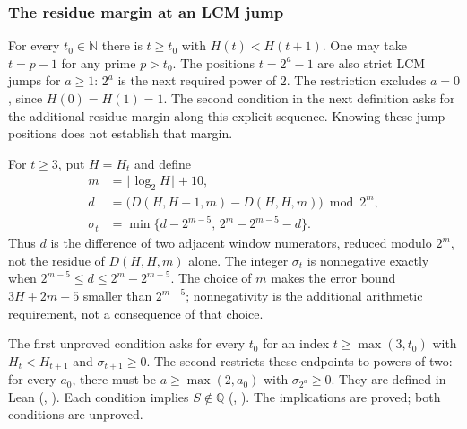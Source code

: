 \subsubsection{The residue margin at an LCM jump}

\begin{thm}\label{thm:arbitrarily-large-prime-power-lcm}
For every $t_0\in\mathbb N$ there is
$t\ge t_0$ with $H(t)<H(t+1)$. One may take $t=p-1$ for any
prime $p>t_0$. The positions $t=2^a-1$ are also strict LCM jumps for $a\ge1$:
$2^a$ is the next required power of $2$. The restriction excludes
$a=0$, since $H(0)=H(1)=1$.
The second condition in the next definition
asks for the additional residue margin along this explicit sequence.
Knowing these jump positions does not establish that margin.
\end{thm}

\begin{defn}
For $t\ge3$, put $H=H_t$ and define
\[
 \begin{aligned}
 m&=\lfloor\log_2 H\rfloor+10,\\
 d&=\bigl(D(H,H+1,m)-D(H,H,m)\bigr)\bmod2^m,\\
 \sigma_t&=\min\{d-2^{m-5},\,2^m-2^{m-5}-d\}.
 \end{aligned}
\]
Thus $d$ is the difference of two adjacent window numerators, reduced
modulo $2^m$, not the residue of $D(H,H,m)$ alone. The integer
$\sigma_t$ is nonnegative exactly when
$2^{m-5}\le d\le2^m-2^{m-5}$. The choice of $m$ makes the error
bound $3H+2m+5$ smaller than $2^{m-5}$; nonnegativity is the
additional arithmetic requirement, not a consequence of that choice.

The first unproved condition asks for every $t_0$ for an index
$t\ge\max(3,t_0)$ with $H_t<H_{t+1}$ and $\sigma_{t+1}\ge0$.
The second restricts these endpoints to powers of two: for every $a_0$,
there must be $a\ge\max(2,a_0)$ with $\sigma_{2^a}\ge0$.
They are defined in Lean
(,
).
Each condition implies $S\notin\mathbb Q$
(,
).
The implications are proved; both conditions are unproved.
\end{defn}

